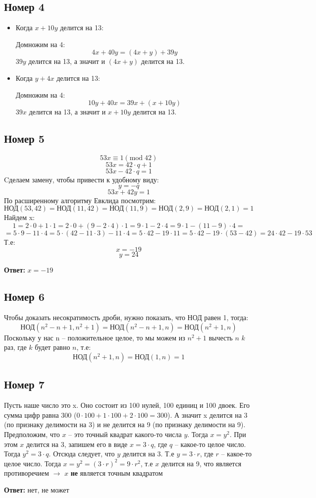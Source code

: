 \documentclass[a4paper,12pt]{article}
\begin{document}
\subsection*{Номер 4}
\begin{itemize}
\item Когда $x+10y$ делится на 13:

Домножим на 4:
\[
4x + 40y = (4x + y) + 39y 
\]
$39y$ делится на 13, а значит и $(4x+y)$ делится на 13.

\item Когда $y+4x$ делится на 13:

Домножим на 4:
\[
10y + 40x = 39x + (x + 10y)
\]
$39x$ делится на 13, а значит и $x + 10y$ делится на 13. 
\end{itemize}
\newpage
\subsection*{Номер 5}
\[
53x \equiv 1 (\text{mod} \; 42)
\]
\[
53x = 42 \cdot q  + 1 
\]
\[
53x - 42 \cdot q = 1
\]
Cделаем замену, чтобы привести к удобному виду:
\[
y = - q
\]
\[
53x + 42 y = 1
\]
По расширенному алгоритму Евклида посмотрим:
\[
\text{НОД}(53, 42) = \text{НОД} (11, 42) = \text{НОД}(11, 9) = \text{НОД} (2, 9) = \text{НОД} (2, 1) = 1 
\]
Найдем x:
\[
1 = 2 \cdot 0 + 1 \cdot 1 = 2 \cdot 0 + (9 - 2 \cdot 4) \cdot 1 = 9 \cdot 1 - 2 \cdot 4 = 9 \cdot 1 - (11 - 9) \cdot 4 = 
\]
\[
= 5 \cdot 9 - 11 \cdot 4 = 5 \cdot (42 - 11 \cdot 3) - 11 \cdot 4 = 5 \cdot 42 - 19 \cdot 11 = 5 \cdot 42 - 19 \cdot (53 - 42) = 24 \cdot 42 - 19 \cdot 53 
\]
Т.е:
\[
x = -19
\]
\[
y = 24 
\]
\begin{center}
\textbf{Ответ:} $x = -19$
\end{center}
\subsection*{Номер 6}
Чтобы доказать несократимость дроби, нужно показать, что НОД равен 1, тогда:
\[
\text{НОД} (n^2 - n + 1, n^2 + 1) = \text{НОД}(n^2 - n + 1, n) = \text{НОД}(n^2 + 1, n)
\]
Поскольку у нас n -- положительное целое, то мы можем из $n^2 + 1$ вычесть $n$ $k$ раз, где $k$ будет равно $n$, т.е:
\[
\text{НОД}(n^2 + 1,n) = \text{НОД} (1, n) = 1
\]

\subsection*{Номер 7}
Пусть наше число это x. Оно состоит из 100 нулей, 100 единиц и 100 двоек. Его сумма цифр равна 300 ($0 \cdot 100 + 1 \cdot 100 + 2 \cdot 100 = 300$). А значит x делится на 3 (по признаку делимости на 3) и не делится на 9 (по признаку делимости на 9). Предположим, что $x$ -- это точный квадрат какого-то числа $y$. Тогда $x = y^2$. При этом $x$ делится на 3, запишем его в виде $x = 3 \cdot q$, где $q$ -- какое-то целое число. Тогда $y^2 = 3 \cdot q$.  Отсюда следует, что $y$ делится на 3. Т.е $y = 3 \cdot r$, где $r$ -- какое-то целое число. Тогда $x = y^2 = (3 \cdot r)^2 = 9 \cdot r^2$, т.е $x$ делится на 9, что является противоречием $\rightarrow$ $x$ \textbf{не} является точным квадратом
\begin{center}
\textbf{Ответ:} нет, не может
\end{center}
\end{document}
